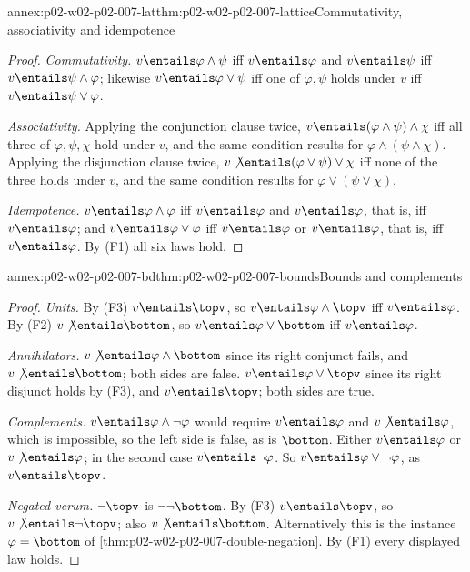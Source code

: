 \begin{annexitem}{annex:p02-w02-p02-007-lat}{thm:p02-w02-p02-007-lattice}{Commutativity, associativity and idempotence}
\begin{proof}
\emph{Commutativity.}  \(v\entails\varphi\land\psi\) iff
\(v\entails\varphi\) and \(v\entails\psi\) iff \(v\entails\psi\land\varphi\);
likewise \(v\entails\varphi\lor\psi\) iff one of \(\varphi,\psi\) holds under
\(v\) iff \(v\entails\psi\lor\varphi\).

\emph{Associativity.}  Applying the conjunction clause twice,
\(v\entails(\varphi\land\psi)\land\chi\) iff all three of
\(\varphi,\psi,\chi\) hold under \(v\), and the same condition results for
\(\varphi\land(\psi\land\chi)\).  Applying the disjunction clause twice,
\(v\not\entails(\varphi\lor\psi)\lor\chi\) iff none of the three holds under
\(v\), and the same condition results for \(\varphi\lor(\psi\lor\chi)\).

\emph{Idempotence.}  \(v\entails\varphi\land\varphi\) iff
\(v\entails\varphi\) and \(v\entails\varphi\), that is, iff
\(v\entails\varphi\); and \(v\entails\varphi\lor\varphi\) iff
\(v\entails\varphi\) or \(v\entails\varphi\), that is, iff
\(v\entails\varphi\).  By (F1) all six laws hold.
\end{proof}
\end{annexitem}

\begin{annexitem}{annex:p02-w02-p02-007-bd}{thm:p02-w02-p02-007-bounds}{Bounds and complements}
\begin{proof}
\emph{Units.}  By (F3) \(v\entails\topv\), so \(v\entails\varphi\land\topv\)
iff \(v\entails\varphi\).  By (F2) \(v\not\entails\bottom\), so
\(v\entails\varphi\lor\bottom\) iff \(v\entails\varphi\).

\emph{Annihilators.}  \(v\not\entails\varphi\land\bottom\) since its right
conjunct fails, and \(v\not\entails\bottom\); both sides are false.
\(v\entails\varphi\lor\topv\) since its right disjunct holds by (F3), and
\(v\entails\topv\); both sides are true.

\emph{Complements.}  \(v\entails\varphi\land\neg\varphi\) would require
\(v\entails\varphi\) and \(v\not\entails\varphi\), which is impossible, so
the left side is false, as is \(\bottom\).  Either \(v\entails\varphi\) or
\(v\not\entails\varphi\); in the second case \(v\entails\neg\varphi\).
So \(v\entails\varphi\lor\neg\varphi\), as \(v\entails\topv\).

\emph{Negated verum.}  \(\neg\topv\) is \(\neg\neg\bottom\).  By (F3)
\(v\entails\topv\), so \(v\not\entails\neg\topv\); also
\(v\not\entails\bottom\).  Alternatively this is the instance
\(\varphi=\bottom\) of \cref{thm:p02-w02-p02-007-double-negation}.  By (F1)
every displayed law holds.
\end{proof}
\end{annexitem}

